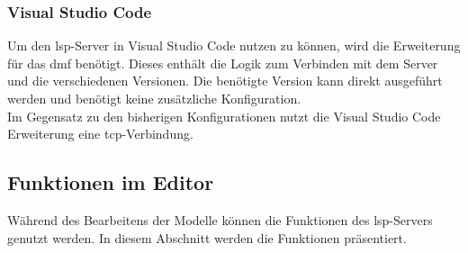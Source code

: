 \documentclass[./einleitung.tex]{subfiles}
\begin{document}
    \subsubsection{Visual Studio Code}
    Um den \acrshort{lsp}-Server in Visual Studio Code nutzen zu können, wird die Erweiterung für das \acrshort{dmf} benötigt.
    Dieses enthält die Logik zum Verbinden mit dem Server und die verschiedenen Versionen.
    Die benötigte Version kann direkt ausgeführt werden und benötigt keine zusätzliche Konfiguration.\\
    Im Gegensatz zu den bisherigen Konfigurationen nutzt die Visual Studio Code Erweiterung eine \acrshort{tcp}-Verbindung.


    \subsection{Funktionen im Editor}
    Während des Bearbeitens der Modelle können die Funktionen des \acrshort{lsp}-Servers genutzt werden.
    In diesem Abschnitt werden die Funktionen präsentiert.
    
\end{document}
